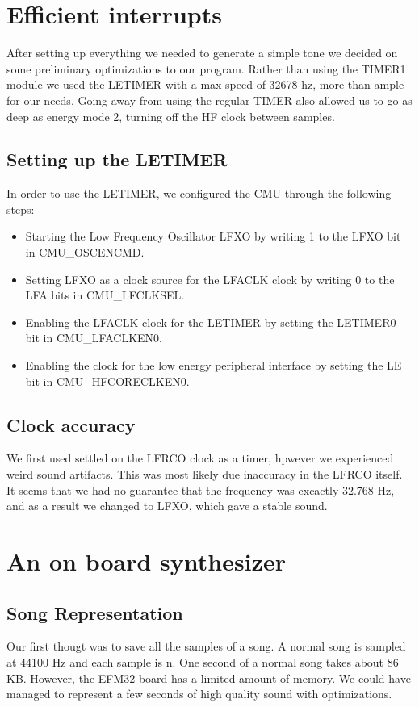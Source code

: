 \section{Efficient interrupts}
After setting up everything we needed to generate a simple tone we decided on some preliminary optimizations to our program. Rather than using the TIMER1 module we used the LETIMER with a max speed of 32678 hz, more than ample for our needs. Going away from using the regular TIMER also allowed us to go as deep as energy mode 2, turning off the HF clock between samples.

\subsection{Setting up the LETIMER}
In order to use the LETIMER, we configured the CMU through the following steps:
\begin{itemize}
  \item Starting the Low Frequency Oscillator LFXO by writing 1 to the LFXO bit in CMU\_OSCENCMD.
  \item Setting LFXO as a clock source for the LFACLK clock by writing 0 to the LFA bits in CMU\_LFCLKSEL.
  \item Enabling the LFACLK clock for the LETIMER by setting the LETIMER0 bit in CMU\_LFACLKEN0.
  \item Enabling the clock for the low energy peripheral interface by setting the LE bit in CMU\_HFCORECLKEN0.
\end{itemize}

\subsection{Clock accuracy}
We first used settled on the LFRCO clock as a timer, hpwever we experienced weird sound artifacts. This was most likely due inaccuracy in the LFRCO itself. It seems that we had no guarantee that the frequency was excactly 32.768 Hz, and as a result we changed to LFXO, which gave a stable sound.


\section{An on board synthesizer}


\subsection{Song Representation}
Our first thougt was to save all the samples of a song. A normal song is sampled at 44100 Hz and each sample is n. One second of a normal song takes about 86 KB. However, the EFM32 board has a limited amount of memory. We could have managed to represent a few seconds of high quality sound with optimizations. 

